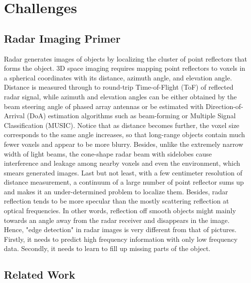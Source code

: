 \section{Challenges} \label{challenges}

\subsection{Radar Imaging Primer}
Radar generates images of objects by localizing the cluster of point reflectors that forms the object. 3D space imaging requires mapping point reflectors to voxels in a spherical coordinates with its distance, azimuth angle, and elevation angle. Distance is measured through to round-trip Time-of-Flight (ToF) of reflected radar signal, while azimuth and elevation angles can be either obtained by the beam steering angle of phased array antennas or be estimated with Direction-of-Arrival (DoA) estimation algorithms such as beam-forming or Multiple Signal Classification (MUSIC). Notice that as distance becomes further, the voxel size corresponds to the same angle increases, so that long-range objects contain much fewer voxels and appear to be more blurry. Besides, unlike the extremely narrow width of light beams, the cone-shape radar beam with sidelobes cause interference and leakage among nearby voxels and even the environment, which smears generated images. Last but not least, with a few centimeter resolution of distance measurement, a continuum of a large number of point reflector sums up and makes it an under-determined problem to localize them. Besides, radar reflection tends to be more specular than the mostly scattering reflection at optical frequencies. In other words, reflection off smooth objects might mainly towards an angle away from the radar receiver and disappears in the image. Hence, "edge detection" in radar images is very different from that of pictures. Firstly, it needs to predict high frequency information with only low frequency data. Secondly, it needs to learn to fill up missing parts of the object. 

\subsection{Related Work}

